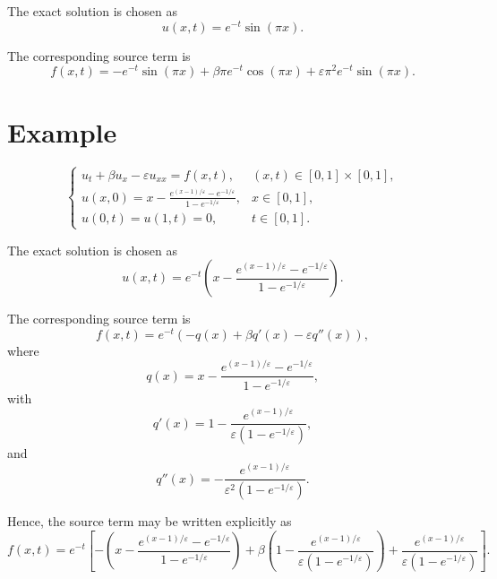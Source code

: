 \documentclass[10pt,reqno]{article}
\numberwithin{equation}{section}
\begin{document}
The exact solution is chosen as
\begin{equation}
\label{eq:exact_solution}
u(x,t)=e^{-t}\sin(\pi x).
\end{equation}

The corresponding source term is
\begin{equation}
\label{eq:source_term}
f(x,t)=
-e^{-t}\sin(\pi x)
+\beta\pi e^{-t}\cos(\pi x)
+\varepsilon\pi^2 e^{-t}\sin(\pi x).
\end{equation}

\section*{Example}
\begin{equation}
\label{eq:model_problem}
\begin{cases}
u_t + \beta u_x - \varepsilon u_{xx} = f(x,t), & (x,t)\in[0,1]\times[0,1], \\[2mm]
u(x,0)=x-\displaystyle\frac{e^{(x-1)/\varepsilon}-e^{-1/\varepsilon}}{1-e^{-1/\varepsilon}}, & x\in[0,1], \\[4mm]
u(0,t)=u(1,t)=0, & t\in[0,1].
\end{cases}
\end{equation}

The exact solution is chosen as
\begin{equation}
\label{eq:exact_solution}
u(x,t)=e^{-t}\left(x-\frac{e^{(x-1)/\varepsilon}-e^{-1/\varepsilon}}{1-e^{-1/\varepsilon}}\right).
\end{equation}

The corresponding source term is
\begin{equation}
\label{eq:source_term}
f(x,t)
=
e^{-t}\left(
-q(x)
+\beta q'(x)
-\varepsilon q''(x)
\right),
\end{equation}
where
\begin{equation}
q(x)=x-\frac{e^{(x-1)/\varepsilon}-e^{-1/\varepsilon}}{1-e^{-1/\varepsilon}},
\end{equation}
with
\begin{equation}
q'(x)=1-\frac{e^{(x-1)/\varepsilon}}{\varepsilon\left(1-e^{-1/\varepsilon}\right)},
\end{equation}
and
\begin{equation}
q''(x)=-\frac{e^{(x-1)/\varepsilon}}{\varepsilon^2\left(1-e^{-1/\varepsilon}\right)}.
\end{equation}

Hence, the source term may be written explicitly as
\begin{equation}
\label{eq:source_term_explicit}
f(x,t)
=
e^{-t}
\left[
-\left(x-\frac{e^{(x-1)/\varepsilon}-e^{-1/\varepsilon}}{1-e^{-1/\varepsilon}}\right)
+\beta\left(1-\frac{e^{(x-1)/\varepsilon}}{\varepsilon\left(1-e^{-1/\varepsilon}\right)}\right)
+\frac{e^{(x-1)/\varepsilon}}{\varepsilon\left(1-e^{-1/\varepsilon}\right)}
\right].
\end{equation}
\end{document}
